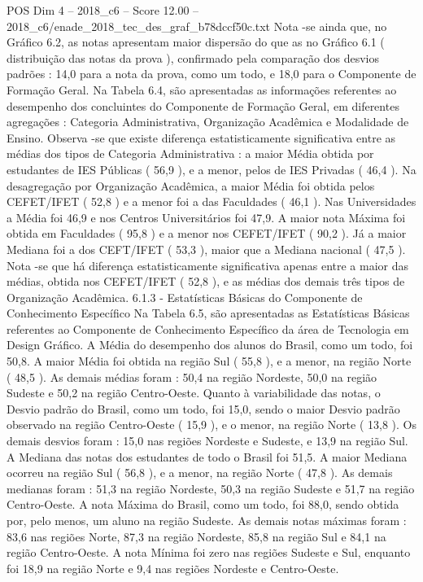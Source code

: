 \begin{textsample}{POS Dim 4 – 2018\_c6 – Score 12.00 – 2018\_c6/enade\_2018\_tec\_des\_graf\_b78dccf50c.txt}
Nota -se ainda que, no Gráfico 6.2, as notas apresentam maior dispersão do que as no Gráfico 6.1 ( distribuição das notas da prova ), confirmado pela comparação dos desvios padrões : 14,0 para a nota da prova, como um todo, e 18,0 para o Componente de Formação Geral.
Na Tabela 6.4, são apresentadas as informações referentes ao desempenho dos concluintes do Componente de Formação Geral, em diferentes agregações : Categoria Administrativa, Organização Acadêmica e Modalidade de Ensino.
Observa -se que existe diferença estatisticamente significativa entre as médias dos tipos de Categoria Administrativa : a maior Média obtida por estudantes de IES Públicas ( 56,9 ), e a menor, pelos de IES Privadas ( 46,4 ).
Na desagregação por Organização Acadêmica, a maior Média foi obtida pelos CEFET/IFET ( 52,8 ) e a menor foi a das Faculdades ( 46,1 ).
Nas Universidades a Média foi 46,9 e nos Centros Universitários foi 47,9.
A maior nota Máxima foi obtida em Faculdades ( 95,8 ) e a menor nos CEFET/IFET ( 90,2 ).
Já a maior Mediana foi a dos CEFT/IFET ( 53,3 ), maior que a Mediana nacional ( 47,5 ).
Nota -se que há diferença estatisticamente significativa apenas entre a maior das médias, obtida nos CEFET/IFET ( 52,8 ), e as médias dos demais três tipos de Organização Acadêmica. 6.1.3 - Estatísticas Básicas do Componente de Conhecimento Específico Na Tabela 6.5, são apresentadas as Estatísticas Básicas referentes ao Componente de Conhecimento Específico da área de Tecnologia em Design Gráfico.
A Média do desempenho dos alunos do Brasil, como um todo, foi 50,8.
A maior Média foi obtida na região Sul ( 55,8 ), e a menor, na região Norte ( 48,5 ).
As demais médias foram : 50,4 na região Nordeste, 50,0 na região Sudeste e 50,2 na região Centro-Oeste.
Quanto à variabilidade das notas, o Desvio padrão do Brasil, como um todo, foi 15,0, sendo o maior Desvio padrão observado na região Centro-Oeste ( 15,9 ), e o menor, na região Norte ( 13,8 ).
Os demais desvios foram : 15,0 nas regiões Nordeste e Sudeste, e 13,9 na região Sul.
A Mediana das notas dos estudantes de todo o Brasil foi 51,5.
A maior Mediana ocorreu na região Sul ( 56,8 ), e a menor, na região Norte ( 47,8 ).
As demais medianas foram : 51,3 na região Nordeste, 50,3 na região Sudeste e 51,7 na região Centro-Oeste.
A nota Máxima do Brasil, como um todo, foi 88,0, sendo obtida por, pelo menos, um aluno na região Sudeste.
As demais notas máximas foram : 83,6 nas regiões Norte, 87,3 na região Nordeste, 85,8 na região Sul e 84,1 na região Centro-Oeste.
A nota Mínima foi zero nas regiões Sudeste e Sul, enquanto foi 18,9 na região Norte e 9,4 nas regiões Nordeste e Centro-Oeste.

\end{textsample}

